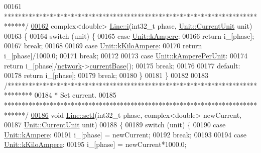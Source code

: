 \begin{DoxyCode}
00161 \textcolor{comment}{ ******************************************************************************/}
\hypertarget{line_8cpp_source_l00162}{}\hyperlink{group___models_gaf81e7055102816465bdf7e19afc2d547}{00162} complex<double> \hyperlink{group___models_gaf81e7055102816465bdf7e19afc2d547}{Line::i}(int32\_t phase, \hyperlink{class_unit_a0794cf6c9682f48296dd4a5315389787}{Unit::CurrentUnit} unit)
00163 \{
00164   \textcolor{keywordflow}{switch} (unit) \{
00165   \textcolor{keywordflow}{case} \hyperlink{class_unit_a0794cf6c9682f48296dd4a5315389787a368a3c470f0b590a6100dda717a7dd4f}{Unit::kAmpere}:
00166     \textcolor{keywordflow}{return} i\_[phase];
00167     \textcolor{keywordflow}{break};
00168 
00169   \textcolor{keywordflow}{case} \hyperlink{class_unit_a0794cf6c9682f48296dd4a5315389787aa27cb5edd73099f24f2285e02396ae14}{Unit::kKiloAmpere}:
00170     \textcolor{keywordflow}{return} i\_[phase]/1000.0;
00171     \textcolor{keywordflow}{break};
00172 
00173   \textcolor{keywordflow}{case} \hyperlink{class_unit_a0794cf6c9682f48296dd4a5315389787aeed3b50e464d581cb630181a3b6a0709}{Unit::kAmperePerUnit}:
00174     \textcolor{keywordflow}{return} i\_[phase]/\hyperlink{class_line_aefdf6a6c3e3775b5a16b344c1d33964e}{network}->\hyperlink{group___graphics_ga433bc5c32cf2ce5329bb40b21952d885}{currentBase}();
00175     \textcolor{keywordflow}{break};
00176 
00177   \textcolor{keywordflow}{default}:
00178     \textcolor{keywordflow}{return} i\_[phase];
00179     \textcolor{keywordflow}{break};
00180   \}
00181 \}
00182 
00183 \textcolor{comment}{/*******************************************************************************}
00184 \textcolor{comment}{ * Set current.}
00185 \textcolor{comment}{ ******************************************************************************/}
\hypertarget{line_8cpp_source_l00186}{}\hyperlink{group___models_ga9e55b06dc3e385838fdd13d5580438ef}{00186} \textcolor{keywordtype}{void} \hyperlink{group___models_ga9e55b06dc3e385838fdd13d5580438ef}{Line::setI}(int32\_t phase, complex<double> newCurrent,
00187                 \hyperlink{class_unit_a0794cf6c9682f48296dd4a5315389787}{Unit::CurrentUnit} unit)
00188 \{
00189   \textcolor{keywordflow}{switch} (unit) \{
00190   \textcolor{keywordflow}{case} \hyperlink{class_unit_a0794cf6c9682f48296dd4a5315389787a368a3c470f0b590a6100dda717a7dd4f}{Unit::kAmpere}:
00191     i\_[phase] = newCurrent;
00192     \textcolor{keywordflow}{break};
00193 
00194   \textcolor{keywordflow}{case} \hyperlink{class_unit_a0794cf6c9682f48296dd4a5315389787aa27cb5edd73099f24f2285e02396ae14}{Unit::kKiloAmpere}:
00195     i\_[phase] = newCurrent*1000.0;

\end{DoxyCode}
